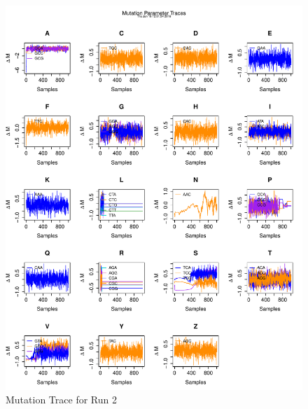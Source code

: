 \documentclass[11pt]{labbook}
\begin{document}
\begin{itemize}
\begin{figure}
            \includegraphics[scale=.65]{FONSE_Plots/2016/June_16/Run2_MutationTrace}
            \caption{Mutation Trace for Run 2}
            \label{fig:JUN16_MUT_R2}
        \end{figure}
         \begin{figure}
            \centering

\end{figure}
\end{itemize}
\end{document}
